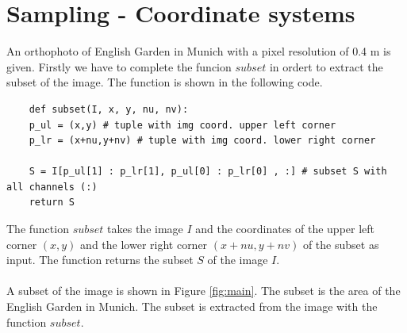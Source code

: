 \documentclass[12pt
,headinclude
,headsepline
,bibtotocnumbered
]{scrartcl}
\begin{document}
\section{Sampling - Coordinate systems}
An orthophoto of English Garden in Munich with a pixel resolution of 0.4 m is given.
Firstly we have to complete the funcion $subset$ in ordert to extract the subset of the image. The function is shown in the following code.
\begin{lstlisting}
    def subset(I, x, y, nu, nv):
    p_ul = (x,y) # tuple with img coord. upper left corner
    p_lr = (x+nu,y+nv) # tuple with img coord. lower right corner
    
    S = I[p_ul[1] : p_lr[1], p_ul[0] : p_lr[0] , :] # subset S with all channels (:)
    return S
\end{lstlisting}
The function $subset$ takes the image $I$ and the coordinates of the upper left corner $(x,y)$ and the lower right corner $(x+nu,y+nv)$ of the subset as input. The function returns the subset $S$ of the image $I$.
\\\\
A subset of the image is shown in Figure \ref{fig:main}. The subset is the area of the English Garden in Munich. The subset is extracted from the image with the function $subset$.
\end{document}
